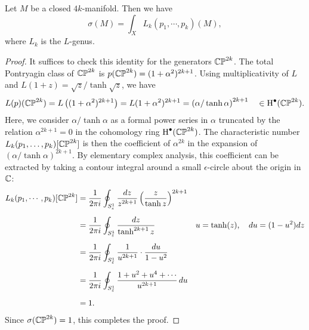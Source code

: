 \begin{theorem}[Hirzebruch]\label{thm:hirzebruch-signature-theorem}
	Let $M$ be a closed $4k$-manifold. Then we have
	\[
		\sigma(M) = \int_X L_k(p_1, \cdots, p_k)(M),
	\]
	where $L_k$ is the $L$-genus.
\end{theorem}
\begin{proof}
	It suffices to check this identity for the generators $\mathbb{CP}^{2k}$. The total Pontryagin class of $\mathbb{CP}^{2k}$ is $p(\mathbb{CP}^{2k})=(1+\alpha^2)^{2k+1}$. Using multiplicativity of $L$ and $L(1+z)=\sqrt{z}/\tanh\sqrt{z}$, we have
	\[
		\begin{aligned}
			L(p)(\mathbb{CP}^{2k})
			= L\left((1+\alpha^2)^{2k+1}\right)
			= L(1+\alpha^2)^{2k+1}
			= \left(\alpha/\tanh \alpha\right)^{2k+1}
			\quad\in\operatorname{H}^\bullet(\mathbb{CP}^{2k}).
		\end{aligned}
	\]
	Here, we consider $\alpha/\tanh \alpha$ as a formal power series in $\alpha$ truncated by the relation $\alpha^{2k+1}=0$ in the cohomology ring $\operatorname{H}^\bullet(\mathbb{CP}^{2k})$. The characteristic number $L_k(p_1,\ldots,p_k)[\mathbb{CP}^{2k}]$ is then the coefficient of $\alpha^{2k}$ in the expansion of $(\alpha/\tanh \alpha)^{2k+1}$.
	By elementary complex analysis, this coefficient can be extracted by taking a contour integral around a small $\epsilon$-circle about the origin in $\mathbb{C}$:
	\[
		\begin{aligned}
			L_k(p_1,\cdots, p_k)[\mathbb{CP}^{2k}]
			 & = \frac{1}{2\pi i}\oint_{S^1_\varepsilon} \frac{dz}{z^{2k+1}} \left(\frac{z}{\tanh z}\right)^{2k+1}
			 &                                                                                                       \\[0.5em]
			 & = \frac{1}{2\pi i}\oint_{S^1_\varepsilon} \frac{dz}{\tanh^{2k+1} z}\quad
			 & u  =\tanh(z),\quad
			du =(1-u^2)dz
			\\[0.5em]
			 & = \frac{1}{2\pi i}\oint_{S^1_\varepsilon} \frac{1}{u^{2k+1}}\cdot\frac{du}{1-u^2}
			 &                                                                                                       \\[0.5em]
			 & = \frac{1}{2\pi i}\oint_{S^1_\varepsilon} \frac{1+u^2+u^4+\cdots}{u^{2k+1}}\,du                       \\[0.5em]
			 & =1.                                                                                                 &
		\end{aligned}
	\]
	Since $\sigma(\mathbb{CP}^{2k})=1$, this completes the proof.
\end{proof}

